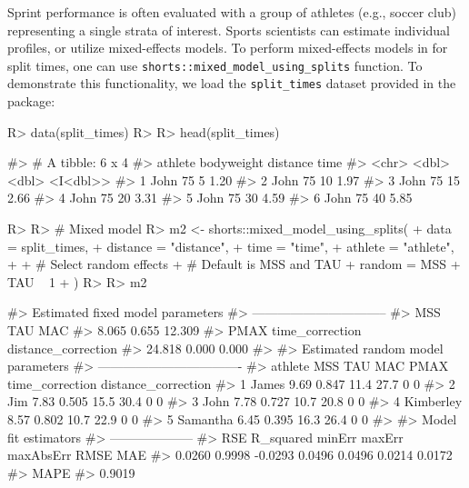 \documentclass[
]{jss}
\begin{document}
Sprint performance is often evaluated with a group of athletes (e.g., soccer club) representing a single strata of interest. Sports scientists can estimate individual profiles, or utilize mixed-effects models. To perform mixed-effects models in  for split times, one can use \texttt{shorts::mixed\_model\_using\_splits} function. To demonstrate this functionality, we load the \texttt{split\_times} dataset provided in the  package:

\begin{CodeChunk}
\begin{CodeInput}
R> data(split_times)
R> 
R> head(split_times)
\end{CodeInput}
\begin{CodeOutput}
#> # A tibble: 6 x 4
#>   athlete bodyweight distance     time
#>   <chr>        <dbl>    <dbl> <I<dbl>>
#> 1 John            75        5     1.20
#> 2 John            75       10     1.97
#> 3 John            75       15     2.66
#> 4 John            75       20     3.31
#> 5 John            75       30     4.59
#> 6 John            75       40     5.85
\end{CodeOutput}
\begin{CodeInput}
R> 
R> # Mixed model
R> m2 <- shorts::mixed_model_using_splits(
+   data = split_times,
+   distance = "distance",
+   time = "time",
+   athlete = "athlete",
+ 
+   # Select random effects
+   # Default is MSS and TAU
+   random = MSS + TAU ~ 1
+ )
R> 
R> m2
\end{CodeInput}
\begin{CodeOutput}
#> Estimated fixed model parameters
#> --------------------------------
#>                 MSS                 TAU                 MAC 
#>               8.065               0.655              12.309 
#>                PMAX     time_correction distance_correction 
#>              24.818               0.000               0.000 
#> 
#> Estimated random model parameters
#> ----------------------------------
#>     athlete  MSS   TAU  MAC PMAX time_correction distance_correction
#> 1     James 9.69 0.847 11.4 27.7               0                   0
#> 2       Jim 7.83 0.505 15.5 30.4               0                   0
#> 3      John 7.78 0.727 10.7 20.8               0                   0
#> 4 Kimberley 8.57 0.802 10.7 22.9               0                   0
#> 5  Samantha 6.45 0.395 16.3 26.4               0                   0
#> 
#> Model fit estimators
#> --------------------
#>       RSE R_squared    minErr    maxErr maxAbsErr      RMSE       MAE 
#>    0.0260    0.9998   -0.0293    0.0496    0.0496    0.0214    0.0172 
#>      MAPE 
#>    0.9019
\end{CodeOutput}
\end{CodeChunk}
\end{document}
